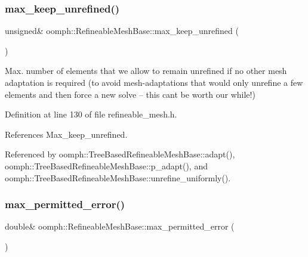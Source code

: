 \mbox{\label{classoomph_1_1RefineableMeshBase_a2216b4d0a8433a1975e6990a5e6533f7}} 
\subsubsection{\texorpdfstring{max\+\_\+keep\+\_\+unrefined()}{max\_keep\_unrefined()}}
{\footnotesize\ttfamily unsigned\& oomph\+::\+Refineable\+Mesh\+Base\+::max\+\_\+keep\+\_\+unrefined (\begin{DoxyParamCaption}{ }\end{DoxyParamCaption})\hspace{0.3cm}{\ttfamily [inline]}}



Max. number of elements that we allow to remain unrefined if no other mesh adaptation is required (to avoid mesh-\/adaptations that would only unrefine a few elements and then force a new solve -- this can\textquotesingle{}t be worth our while!) 



Definition at line 130 of file refineable\+\_\+mesh.\+h.



References Max\+\_\+keep\+\_\+unrefined.



Referenced by oomph\+::\+Tree\+Based\+Refineable\+Mesh\+Base\+::adapt(), oomph\+::\+Tree\+Based\+Refineable\+Mesh\+Base\+::p\+\_\+adapt(), and oomph\+::\+Tree\+Based\+Refineable\+Mesh\+Base\+::unrefine\+\_\+uniformly().

\mbox{\label{classoomph_1_1RefineableMeshBase_adb5ba9ac30bf0a0683eb30f5703800e4}} 
\subsubsection{\texorpdfstring{max\+\_\+permitted\+\_\+error()}{max\_permitted\_error()}}
{\footnotesize\ttfamily double\& oomph\+::\+Refineable\+Mesh\+Base\+::max\+\_\+permitted\+\_\+error (\begin{DoxyParamCaption}{ }\end{DoxyParamCaption})\hspace{0.3cm}{\ttfamily [inline]}}



